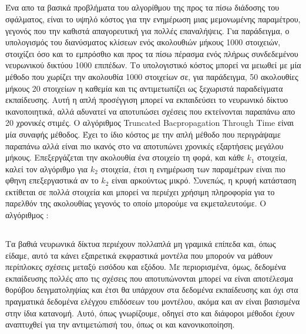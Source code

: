 \subsection{}
Ένα απο τα βασικά προβλήματα του αλγορίθμου της προς τα πίσω διάδοσης του σφάλματος, είναι το υψηλό κόστος για την ενημέρωση μιας μεμονωμένης παραμέτρου, γεγονός που την καθιστά απαγορευτική για πολλές επαναλήψεις.
Για παράδειγμα, ο υπολογισμός του διανύσματος κλίσεων ενός  ακολουθιών μήκους 1000 στοιχειών, στοιχίζει όσο και το εμπρόσθιο και προς τα πίσω πέρασμα ενός πλήρως συνδεδεμένου νευρωνικού δικτύου 1000 επιπέδων.
Το υπολογιστικό κόστος μπορεί να μειωθεί με μία μέθοδο που χωρίζει την ακολουθία 1000 στοιχείων σε, για παράδειγμα, 50 ακολουθίες μήκους 20 στοιχείων η καθεμία και τις αντιμετωπίζει ως ξεχωριστά παραδείγματα εκπαίδευσης.
Αυτή η απλή προσέγγιση μπορεί να εκπαιδεύσει το νευρωνικό δίκτυο ικανοποιητικά, αλλά αδυνατεί να αποτυπώσει σχέσεις που εκτείνονται παραπάνω απο 20 χρονικές στιμές.
Ο αλγόριθμος Truncated Bacpropagation Through Time είναι μία συναφής μέθοδος.
Έχει το ίδιο κόστος με την απλή μέθοδο που περιγράψαμε παραπάνω αλλά είναι πιο ικανός στο να αποτυπώνει χρονικές εξαρτήσεις μεγάλου μήκους.
Επεξεργάζεται την ακολουθία ένα στοιχείο τη φορά, και κάθε $k_1$ στοιχεία, καλεί τον αλγόριθμο  για $k_2$ στοιχεία, έτσι η ενημέρωση των παραμέτρων είναι πιο φθηνη επεξεργαστικά αν το $k_2$ είναι αρκούντως μικρό.
Συνεπώς, η κρυφή κατάσταση εκτίθεται σε πολλά στοιχεία και μπορεί να περιέχει χρήσιμη πληροφορία για το παρελθόν της ακολουθίας γεγονός το οποίο μπορούμε να εκμεταλευτούμε.
Ο αλγόριθμος :

\begin{algorithm}
\caption{}
\begin{algorithmic}
\ENDIF
\ENDFOR
\end{algorithmic}
\end{algorithm}

\subsection{\cite{Srivastava2014}}

Τα βαθιά νευρωνικά δίκτυα περιέχουν πολλαπλά μη γραμικά επίπεδα και, όπως είδαμε, αυτό τα κάνει εξαιρετικά εκφραστικά μοντέλα που μπορούν να μάθουν περίπλοκες σχέσεις μεταξύ εισόδου και εξόδου.
Με περιορισμένα, όμως, δεδομένα εκπαίδευσης πολλές απο τις σχέσεις που αποτυπώνονται μπορεί να είναι αποτέλεσμα θορύβου δειγματοληψίας και έτσι θα υπάρχουν στα δεδομένα εκπαίδευσης και όχι στα πραγματικά δεδομένα ελέγχου επιδόσεων του μοντέλου, ακόμα και αν είναι βασισμένα στην ίδια κατανομή.
Αυτό, όπως γνωρίζουμε, οδηγεί στο  και διάφοροι μέθοδοι έχουν αναπτυχθεί για την αντιμετώπισή του, όπως οι  και  κανονικοποίηση.

